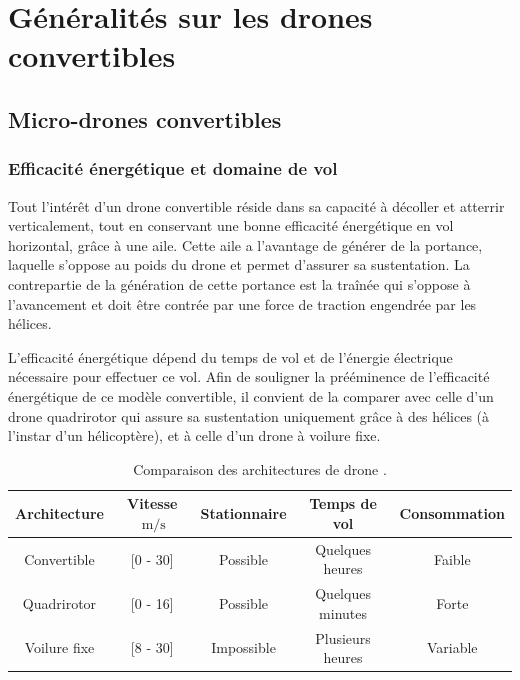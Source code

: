 \chapter{Généralités sur les drones convertibles}
\minitoc
\label{chap:generalites}


\section{Micro-drones convertibles}

    \subsection{Efficacité énergétique et domaine de vol} 
    Tout l'intérêt d'un drone convertible réside dans sa capacité à décoller et atterrir verticalement, tout en conservant une bonne efficacité énergétique en vol horizontal, grâce à une aile. Cette aile a l'avantage de générer de la portance, laquelle s'oppose au poids du drone et permet d'assurer sa sustentation. La contrepartie de la génération de cette portance est la traînée qui s'oppose à l'avancement et doit être contrée par une force de traction engendrée par les hélices. 
    
     L'efficacité énergétique dépend du temps de vol et de l'énergie électrique nécessaire pour effectuer ce vol. Afin de souligner la prééminence de l'efficacité énergétique de ce modèle convertible, il convient de la comparer avec celle d'un drone quadrirotor qui assure sa sustentation uniquement grâce à des hélices (à l'instar d'un hélicoptère), et à celle d'un drone à voilure fixe.
    \begin{table}[ht]
        \centering
        \begin{tabular}{|c|c|c|c|c|}
            \hline
            Architecture & Vitesse $\SI{}{\meter\per\second}$  & Stationnaire & Temps de vol & Consommation\\
            \hline \hline
            Convertible & [0 - 30] & Possible & Quelques heures & Faible\\
            \hline
            Quadrirotor & [0 - 16] & Possible& Quelques minutes & Forte\\
            \hline
            Voilure fixe & [8 - 30] & Impossible & Plusieurs heures & Variable \\
            \hline
        \end{tabular}
        \caption{Comparaison des architectures de drone \cite[Table 1]{saeed_survey_2018}.}
        \label{tab:architecture}
    \end{table}

